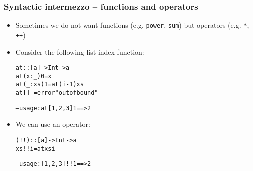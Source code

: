 \documentclass[final,handout]{beamer}
\begin{document}
\begin{frame}[fragile]
    \frametitle{Syntactic intermezzo -- functions and operators}

    \begin{itemize}
        \item Sometimes we do not want functions (e.g. \texttt{power},
            \texttt{sum}) but operators (e.g. \texttt{*}, \texttt{++})

        \item<2-> Consider the following list index function:

    \begin{alltt}
    at :: [a] -> Int -> a
    at (x : _)      0    = x
    at (_ : xs)     1    = at (i - 1) xs
    at []           _    = error "out of bound"

        -- usage:   at [1,2,3] 1     ==> 2
    \end{alltt}

    \vspace {-1em}
        \item<3-> We can use an operator:

    \begin{alltt}
    (!!) :: [a] -> Int -> a
    xs !! i = at xs i

        -- usage:   [1,2,3] !! 1    ==> 2
    \end{alltt}

    \end{itemize}

\end{frame}
\end{document}
